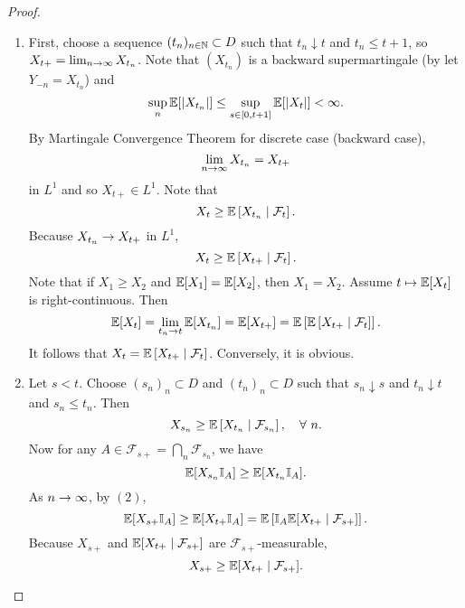 \begin{proof}
\begin{enumerate}[label=(\arabic{*})]
        \item First, choose a sequence $(t_n)_{n \in \mathbb{N}} \subset D$ such that $t_n \downarrow t$ and $t_n \leq t+1$, so $X_{t+} = \lim_{n\rightarrow \infty}X_{t_n}$. Note that $(X_{t_n})$ is a backward supermartingale (by let $Y_{-n} = X_{t_n}$) and
        \begin{equation*}
            \sup_n \mathbb{E}[\left\lvert X_{t_n}\right\lvert] \leq \sup_{s \in [0,t+1]}\mathbb{E}[\left\lvert X_t\right\lvert] < \infty.
        \end{equation*}
        By Martingale Convergence Theorem for discrete case (backward case),
        \begin{equation*}
            \lim_{n \rightarrow \infty} X_{t_n} = X_{t+}
        \end{equation*}
        in $L^1$ and so $X_{t+} \in L^1$. Note that
        \begin{equation*}
            X_t \geq \mathbb{E}\left[X_{t_n} \mid \mathcal{F}_t\right].
        \end{equation*}
        Because $X_{t_n} \rightarrow X_{t+}$ in $L^1$,
        \begin{equation*}
            X_t \geq \mathbb{E}\left[X_{t+} \mid \mathcal{F}_t\right].
        \end{equation*}
        Note that if $X_1 \geq X_2$ and $\mathbb{E}[X_1] = \mathbb{E}[X_2]$, then $X_1=X_2$. Assume $t \mapsto \mathbb{E}[X_t]$ is right-continuous. Then
        \begin{equation*}
            \mathbb{E}[X_t] = \lim_{t_n \rightarrow t} \mathbb{E}[X_{t_n}] = \mathbb{E}[X_{t+}] = \mathbb{E}\left[\mathbb{E}\left[X_{t+} \mid \mathcal{F}_t\right]\right].
        \end{equation*}
        It follows that $X_t = \mathbb{E}\left[X_{t+} \mid \mathcal{F}_t\right]$. Conversely, it is obvious.

        \item Let $s < t$. Choose $(s_n)_n \subset D$ and $(t_n)_n \subset D$ such that $s_n \downarrow s$ and $t_n \downarrow t$ and $s_n \leq t_n$. Then
        \begin{equation*}
            X_{s_n} \geq \mathbb{E}\left[X_{t_n} \mid \mathcal{F}_{s_n}\right],\quad \forall~n.
        \end{equation*}
        Now for any $A \in \mathcal{F}_{s+} = \bigcap_n\mathcal{F}_{s_n}$, we have
        \begin{equation*}
            \mathbb{E}[X_{s_n}\mathbb{I}_A] \geq \mathbb{E}[X_{t_n}\mathbb{I}_A].
        \end{equation*}
        As $n \rightarrow \infty$, by $(2)$,
        \begin{equation*}
            \mathbb{E}[X_{s+}\mathbb{I}_A] \geq \mathbb{E}[X_{t+}\mathbb{I}_A] = \mathbb{E}\left[\mathbb{I}_A \mathbb{E}[X_{t+} \mid \mathcal{F}_{s+}]\right].
        \end{equation*}
        Because $X_{s+}$ and $\mathbb{E}[X_{t+} \mid \mathcal{F}_{s+}]$ are $\mathcal{F}_{s+}$-measurable,
        \begin{equation*}
            X_{s+} \geq \mathbb{E}[X_{t+} \mid \mathcal{F}_{s+}]. \qedhere
        \end{equation*}
    \end{enumerate}
\end{proof}

